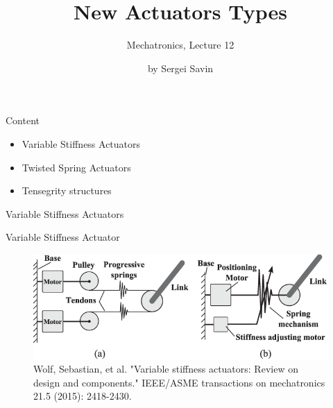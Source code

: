 \documentclass{beamer}
\title{New Actuators Types}
\subtitle{Mechatronics, Lecture 12}
\author{by Sergei Savin}
\date{\mydate}
\begin{document}
\maketitle



\begin{frame}{Content}
\begin{itemize}
	\item Variable Stiffness Actuators
	\item Twisted Spring Actuators
	\item Tensegrity structures
\end{itemize}
\end{frame}



\begin{frame}
	\centerline{Variable Stiffness Actuators}
\end{frame}

\begin{frame}{Variable Stiffness Actuator}
	\begin{flushleft}
		
		\begin{figure}
			\centering
			\includegraphics[width=1.0\linewidth]{VSA_1}
			\caption{Wolf, Sebastian, et al. "Variable stiffness actuators: Review on design and components." IEEE/ASME transactions on mechatronics 21.5 (2015): 2418-2430.}
			\label{fig:vsa1}
		\end{figure}
		
		
	\end{flushleft}
\end{frame}
\end{document}
